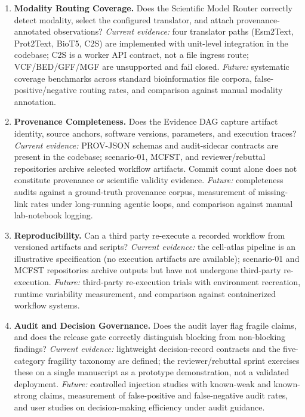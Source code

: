 \documentclass[sn-basic,Numbered,pdflatex]{sn-jnl}
\begin{document}
\begin{enumerate}
    \item \textbf{Modality Routing Coverage.} Does the Scientific Model Router correctly detect modality, select the configured translator, and attach provenance-annotated observations? \textit{Current evidence:} four translator paths (Esm2Text, Prot2Text, BioT5, C2S) are implemented with unit-level integration in the codebase; C2S is a worker API contract, not a file ingress route; VCF/BED/GFF/MGF are unsupported and fail closed. \textit{Future:} systematic coverage benchmarks across standard bioinformatics file corpora, false-positive/negative routing rates, and comparison against manual modality annotation.
    \item \textbf{Provenance Completeness.} Does the Evidence DAG capture artifact identity, source anchors, software versions, parameters, and execution traces? \textit{Current evidence:} PROV-JSON schemas and audit-sidecar contracts are present in the codebase; scenario-01, MCFST, and reviewer/rebuttal repositories archive selected workflow artifacts. Commit count alone does not constitute provenance or scientific validity evidence. \textit{Future:} completeness audits against a ground-truth provenance corpus, measurement of missing-link rates under long-running agentic loops, and comparison against manual lab-notebook logging.
    \item \textbf{Reproducibility.} Can a third party re-execute a recorded workflow from versioned artifacts and scripts? \textit{Current evidence:} the cell-atlas pipeline is an illustrative specification (no execution artifacts are available); scenario-01 and MCFST repositories archive outputs but have not undergone third-party re-execution. \textit{Future:} third-party re-execution trials with environment recreation, runtime variability measurement, and comparison against containerized workflow systems.
    \item \textbf{Audit and Decision Governance.} Does the audit layer flag fragile claims, and does the release gate correctly distinguish blocking from non-blocking findings? \textit{Current evidence:} lightweight decision-record contracts and the five-category fragility taxonomy are defined; the reviewer/rebuttal sprint exercises these on a single manuscript as a prototype demonstration, not a validated deployment. \textit{Future:} controlled injection studies with known-weak and known-strong claims, measurement of false-positive and false-negative audit rates, and user studies on decision-making efficiency under audit guidance.
\end{enumerate}
\end{document}
